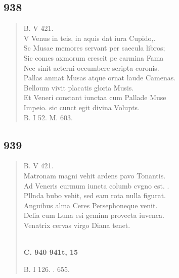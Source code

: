 \documentclass[11pt, a4paper]{report}
\begin{document}
            \subsection*{938}
      \begin{verse}
      B. V 421. \\ V Venus in teis, in aquis dat iura Cupido,. \\ Sc Musae memores servant per saecula libros; \\ Sic comes axmorum crescit pe carmina Fama \\ Nec sinit aeterni occumbere scripta coronis. \\ Pallas anmat Musas atque ornat laude Camenas. \\ Belloum vivit placatis gloria Musis. \\ Et Veneri constant iunctaa cum Pallade Muse \\ Impeio. sic cunct egit divina Volupts. \\ B. I 52. M. 603. \\ 
      \end{verse}
  
            \subsection*{939}
      \begin{verse}
      B. V 421. \\ Matronam magni vehit ardens pavo Tonantis. \\ Ad Veneris curmum iuncta columb cvgno est. . \\ Pllnda bubo vehit, sed eam rota nulla figurat. \\ Anguibus alma Ceres Persephoneque venit. \\ Delia cum Luna esi geminn provecta iuvenca. \\ Venatrix cervas virgo Diana tenet. \\ 
        ﻿\pagebreak 
    \begin{center} \textbf{C. 940 941t, 15} \end{center} \marginpar{[361]} B. I 126. . 655. \\ 
      \end{verse}
  
\end{document}
